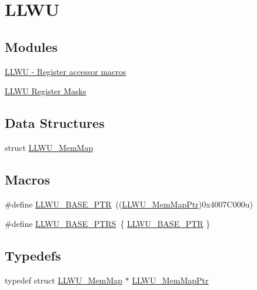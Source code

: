\hypertarget{group___l_l_w_u___peripheral}{}\section{L\+L\+WU}
\label{group___l_l_w_u___peripheral}
\subsection*{Modules}
\begin{DoxyCompactItemize}
\item 
\hyperlink{group___l_l_w_u___register___accessor___macros}{L\+L\+W\+U -\/ Register accessor macros}
\item 
\hyperlink{group___l_l_w_u___register___masks}{L\+L\+W\+U Register Masks}
\end{DoxyCompactItemize}
\subsection*{Data Structures}
\begin{DoxyCompactItemize}
\item 
struct \hyperlink{struct_l_l_w_u___mem_map}{L\+L\+W\+U\+\_\+\+Mem\+Map}
\end{DoxyCompactItemize}
\subsection*{Macros}
\begin{DoxyCompactItemize}
\item 
\#define \hyperlink{group___l_l_w_u___peripheral_ga89c97b9e8756088cb3d8617c022ae6ac}{L\+L\+W\+U\+\_\+\+B\+A\+S\+E\+\_\+\+P\+TR}~((\hyperlink{group___l_l_w_u___peripheral_ga03cfefad45ecbfeb2cd16eb85ccfe186}{L\+L\+W\+U\+\_\+\+Mem\+Map\+Ptr})0x4007\+C000u)
\item 
\#define \hyperlink{group___l_l_w_u___peripheral_ga4826d688973513cc02a2f1d4f67c336b}{L\+L\+W\+U\+\_\+\+B\+A\+S\+E\+\_\+\+P\+T\+RS}~\{ \hyperlink{group___l_l_w_u___peripheral_ga89c97b9e8756088cb3d8617c022ae6ac}{L\+L\+W\+U\+\_\+\+B\+A\+S\+E\+\_\+\+P\+TR} \}
\end{DoxyCompactItemize}
\subsection*{Typedefs}
\begin{DoxyCompactItemize}
\item 
typedef struct \hyperlink{struct_l_l_w_u___mem_map}{L\+L\+W\+U\+\_\+\+Mem\+Map} $\ast$ \hyperlink{group___l_l_w_u___peripheral_ga03cfefad45ecbfeb2cd16eb85ccfe186}{L\+L\+W\+U\+\_\+\+Mem\+Map\+Ptr}
\end{DoxyCompactItemize}


